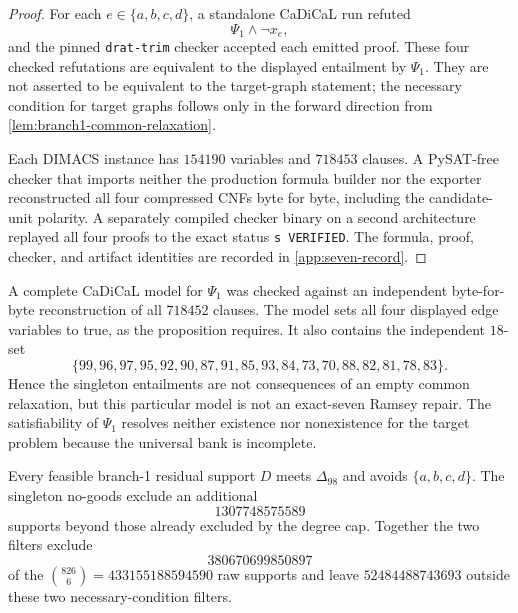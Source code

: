 \begin{proof}
For each \(e\in\{a,b,c,d\}\), a standalone CaDiCaL run refuted
\[
 \Psi_1\wedge\neg x_e,
\]
and the pinned \texttt{drat-trim} checker accepted each emitted proof.  These
four checked refutations are equivalent to the displayed entailment by
\(\Psi_1\).  They are not asserted to be equivalent to the target-graph
statement; the necessary condition for target graphs follows only in the
forward direction from \cref{lem:branch1-common-relaxation}.

Each DIMACS instance has \(154190\) variables and \(718453\) clauses.  A
PySAT-free checker that imports neither the production formula builder nor
the exporter reconstructed all four compressed CNFs byte for byte, including
the candidate-unit polarity.  A separately compiled checker binary on a
second architecture replayed all four proofs to the exact status
\texttt{s VERIFIED}.  The formula, proof, checker, and artifact identities are
recorded in \cref{app:seven-record}.
\end{proof}

\begin{observation}
A complete CaDiCaL model for \(\Psi_1\) was checked against an independent
byte-for-byte reconstruction of all \(718452\) clauses.  The model sets all
four displayed edge variables to true, as the proposition requires.  It also
contains the independent \(18\)-set
\[
 \{99,96,97,95,92,90,87,91,85,93,84,73,70,88,82,81,78,83\}.
\]
Hence the singleton entailments are not consequences of an empty common
relaxation, but this particular model is not an exact-seven Ramsey repair.
The satisfiability of \(\Psi_1\) resolves neither existence nor nonexistence
for the target problem because the universal bank is incomplete.
\end{observation}

\begin{corollary}
\label{cor:branch1-singleton-count}
Every feasible branch-1 residual support \(D\) meets \(\Delta_{98}\) and
avoids \(\{a,b,c,d\}\).  The singleton no-goods exclude an additional
\[
 1307748575589
\]
supports beyond those already excluded by the degree cap.  Together the two
filters exclude
\[
 380670699850897
\]
of the \(\binom{826}{6}=433155188594590\) raw supports and leave
\(52484488743693\) outside these two necessary-condition filters.
\end{corollary}

